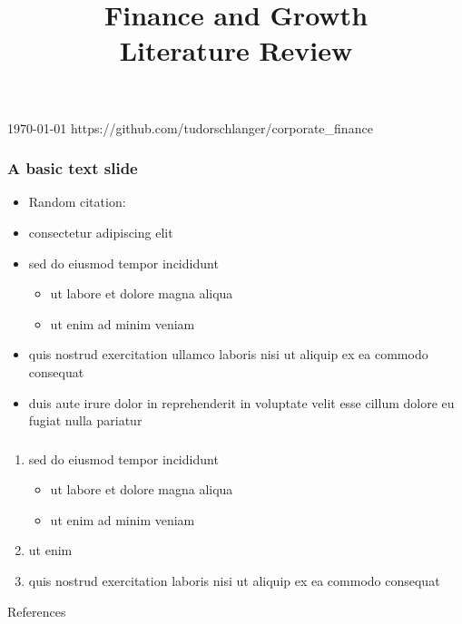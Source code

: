 \documentclass[12pt,xcolor={dvipsnames},hyperref={pdftex,pdfpagemode=UseNone,hidelinks,pdfdisplaydoctitle=true},usepdftitle=false]{beamer}
\newcommand{\bib}{bibliography.bib}
\begin{document}
\title{Finance and Growth \\ Literature Review}
%
{\today}%
{https://github.com/tudorschlanger/corporate_finance}
\frame[plain]{\titlepage}


\begin{frame}
\frametitle{A basic text slide}
    \begin{itemize}
    \item Random citation: \citet{king_finance_1993}
    \item consectetur adipiscing elit
    \item sed do eiusmod tempor incididunt
        \begin{itemize}
        \item ut labore et dolore magna aliqua
        \item ut enim ad minim veniam
        \end{itemize}
    \item quis nostrud exercitation ullamco laboris nisi ut aliquip ex ea commodo consequat
    \item duis aute irure dolor in reprehenderit in voluptate velit esse cillum dolore eu fugiat nulla pariatur
    \end{itemize}
\end{frame}

\begin{frame}
    \frametitle{\citet{king_finance_1993}}
    \begin{enumerate}
    \item sed do eiusmod tempor incididunt
        \begin{itemize}
        \item ut labore et dolore magna aliqua
        \item ut enim ad minim veniam
        \end{itemize}
    \item ut enim 
    \item quis nostrud exercitation  laboris nisi ut aliquip ex ea commodo consequat
    \end{enumerate}
\end{frame}

\begin{frame}[allowframebreaks]{References}
    
\end{frame}


\lastslide
\end{document}
